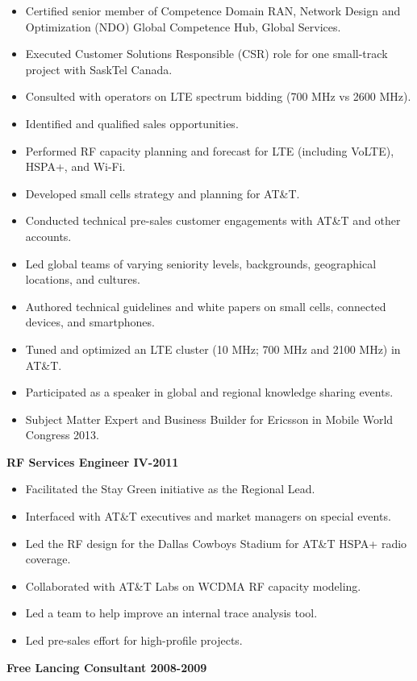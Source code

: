 \documentclass{article}
\begin{document}
\begin{itemize}
\item Certified senior member of Competence Domain RAN, Network Design and Optimization (NDO) Global Competence Hub, Global Services. 
\item Executed Customer Solutions Responsible (CSR) role for one small-track project with SaskTel Canada. 
\item Consulted with operators on LTE spectrum bidding (700 MHz vs 2600 MHz). 
\item Identified and qualified sales opportunities. 
\item Performed RF capacity planning and forecast for LTE (including VoLTE), HSPA+, and Wi-Fi. 
\item Developed small cells strategy and planning for AT\&T. 
\item Conducted technical pre-sales customer engagements with AT\&T and other accounts. 
\item Led global teams of varying seniority levels, backgrounds, geographical locations, and cultures. 
\item Authored technical guidelines and white papers on small cells, connected devices, and smartphones. 
\item Tuned and optimized an LTE cluster (10 MHz; 700 MHz and 2100 MHz) in AT\&T. 
\item Participated as a speaker in global and regional knowledge sharing events. 
\item Subject Matter Expert and Business Builder for Ericsson in Mobile World Congress 2013.
\end{itemize}
\textbf{RF Services Engineer IV\hfill{}-2011}
\begin{itemize}
\item Facilitated the Stay Green initiative as the Regional Lead.
\item Interfaced with AT\&T executives and market managers on special events. 
\item Led the RF design for the Dallas Cowboys Stadium for AT\&T HSPA+ radio coverage.
\item Collaborated with AT\&T Labs on WCDMA RF capacity modeling.
\item Led a team to help improve an internal trace analysis tool.
\item Led pre-sales effort for high-profile projects.
\end{itemize}
\textbf{Free Lancing Consultant \hfill 2008-2009} \\
\end{document}
